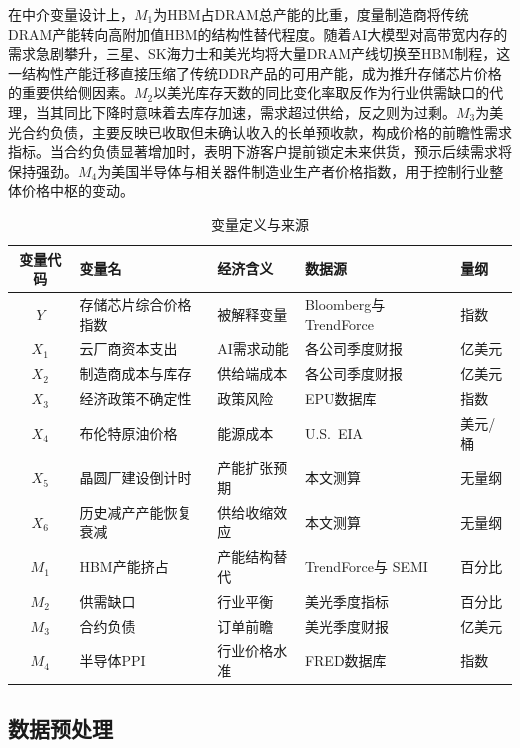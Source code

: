 \documentclass[a4paper,12pt,fontset=fandol]{ctexart}
\begin{document}
在中介变量设计上，$M_1$为HBM占DRAM总产能的比重，度量制造商将传统DRAM产能转向高附加值HBM的结构性替代程度。随着AI大模型对高带宽内存的需求急剧攀升，三星、SK海力士和美光均将大量DRAM产线切换至HBM制程，这一结构性产能迁移直接压缩了传统DDR产品的可用产能，成为推升存储芯片价格的重要供给侧因素。$M_2$以美光库存天数的同比变化率取反作为行业供需缺口的代理，当其同比下降时意味着去库存加速，需求超过供给，反之则为过剩。$M_3$为美光合约负债，主要反映已收取但未确认收入的长单预收款，构成价格的前瞻性需求指标。当合约负债显著增加时，表明下游客户提前锁定未来供货，预示后续需求将保持强劲。$M_4$为美国半导体与相关器件制造业生产者价格指数，用于控制行业整体价格中枢的变动。

\begin{table}[H]
\centering
\renewcommand{\arraystretch}{1.2}
\footnotesize
\begin{tabular}{cllll}
\toprule
变量代码 & 变量名 & 经济含义 & 数据源 & 量纲 \\
\midrule
$Y$ & 存储芯片综合价格指数 & 被解释变量 & Bloomberg与 TrendForce & 指数 \\
$X_1$ & 云厂商资本支出 & AI需求动能 & 各公司季度财报 & 亿美元 \\
$X_2$ & 制造商成本与库存 & 供给端成本 & 各公司季度财报 & 亿美元 \\
$X_3$ & 经济政策不确定性 & 政策风险 & EPU数据库 & 指数 \\
$X_4$ & 布伦特原油价格 & 能源成本 & U.S.\ EIA & 美元/桶 \\
$X_5$ & 晶圆厂建设倒计时 & 产能扩张预期 & 本文测算 & 无量纲 \\
$X_6$ & 历史减产产能恢复衰减 & 供给收缩效应 & 本文测算 & 无量纲 \\
$M_1$ & HBM产能挤占 & 产能结构替代 & TrendForce与 SEMI & 百分比 \\
$M_2$ & 供需缺口 & 行业平衡 & 美光季度指标 & 百分比 \\
$M_3$ & 合约负债 & 订单前瞻 & 美光季度财报 & 亿美元 \\
$M_4$ & 半导体PPI & 行业价格水准 & FRED数据库 & 指数 \\
\bottomrule
\end{tabular}
\caption{变量定义与来源}
\label{tab:variables}
\end{table}

\subsection{数据预处理}
\end{document}
